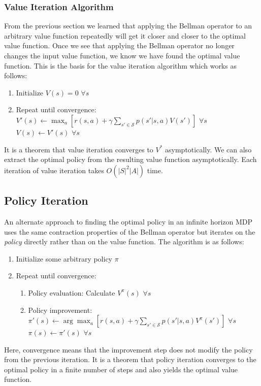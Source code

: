 \subsubsection{Value Iteration Algorithm}
From the previous section we learned that applying the Bellman operator to an arbitrary value function repeatedly will get it closer and closer to the optimal value function. Once we see that applying the Bellman operator no longer changes the input value function, we know we have found the optimal value function. This is the basis for the value iteration algorithm which works as follows:
\begin{enumerate}
    \item Initialize $V(s) = 0$ $\forall s$
    \item Repeat until convergence:\\
    $V'(s) \leftarrow \max_a[r(s, a) + \gamma \sum_{s' \in \mathcal{S}} p(s'|s, a)V(s')]$ $\forall s$\\
    $V(s) \leftarrow V'(s)$ $\forall s$
\end{enumerate}
It is a theorem that value iteration converges to $V^*$ asymptotically. We can also extract the optimal policy from the resulting value function asymptotically. Each iteration of value iteration takes $O(|S|^2|A|)$ time.

\subsection{Policy Iteration}
An alternate approach to finding the optimal policy in an infinite horizon MDP uses the same contraction properties of the Bellman operator but iterates on the \textit{policy} directly rather than on the value function. The algorithm is as follows:
\begin{enumerate}
    \item Initialize some arbitrary policy $\pi$
    \item Repeat until convergence:
    \begin{enumerate}
        \item Policy evaluation: Calculate $V^{\pi}(s)$ $\forall s$
        \item Policy improvement:\\
        $\pi'(s) \leftarrow \arg\max_a[r(s, a) + \gamma \sum_{s' \in \mathcal{S}}p(s'|s, a) V^{\pi}(s')]$ $\forall s$\\
        $\pi(s) \leftarrow \pi'(s)$ $\forall s$
    \end{enumerate}
\end{enumerate}
Here, convergence means that the improvement step does not modify the policy from the previous iteration. It is a theorem that policy iteration converges to the optimal policy in a finite number of steps and also yields the optimal value function.
